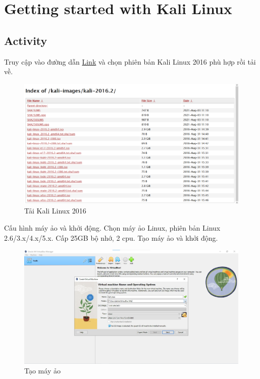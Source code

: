 \section{Getting started with Kali Linux}
\subsection{Activity}

 Truy cập vào đường dẫn \href{https://old.kali.org/kali-images/kali-2016.2/}{Link} và chọn phiên bản Kali Linux 2016 phù hợp rồi tải về.

\begin{figure}[!htb]
    \centering
    \includegraphics[width=0.9\linewidth]{figure//chapter5//lab5_1/download_kali_linux.png}
    \caption{Tải Kali Linux 2016}
    \label{fig:enter-label}
\end{figure}

 Cấu hình máy ảo và khởi động. Chọn máy ảo Linux, phiên bản Linux 2.6/3.x/4.x/5.x. Cấp 25GB bộ nhớ, 2 cpu. Tạo máy ảo và khởi động.

\begin{figure}[!htb]
    \centering
    \includegraphics[width=0.9\linewidth]{figure//chapter5//lab5_1/create_vm.png}
    \caption{Tạo máy ảo}
    \label{fig:enter-label}
\end{figure}

